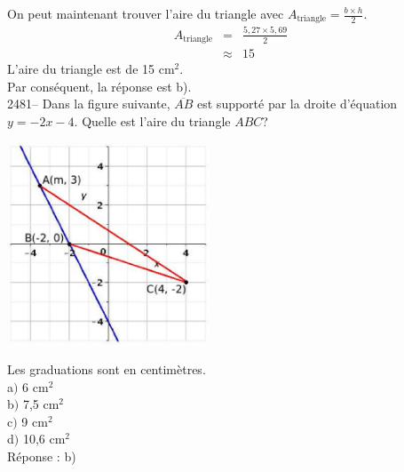 \documentclass[letterpaper, 12pt]{article}
\begin{document}
On peut maintenant trouver l'aire du triangle avec $A_{\textrm{triangle}}=\frac{b\times h}{2}$.
\begin{eqnarray*}
 A_{\textrm{triangle}}&=&\frac{5,27 \times 5,69}{2}\\[2mm]
&\approx&15
\end{eqnarray*}
L'aire du triangle est de 15 cm$^{2}$.\\
Par cons\'equent, la r\'eponse est b).\\

2481-- Dans la figure suivante, $\overline{AB}$ est support\'e par la droite d'\'equation $y=-2x-4$. Quelle est l'aire du triangle $ABC$?
\begin{center}
 \includegraphics[width=6cm,bb=14 14 415 415]{Q2481q.eps}
\end{center}
Les graduations sont en centim\`etres.\\

a$)$ 6 cm$^{2}$\\
b$)$ 7,5 cm$^{2}$\\
c$)$ 9 cm$^{2}$\\
d$)$ 10,6 cm$^{2}$\\

R\'eponse : b)\\
\end{document}

